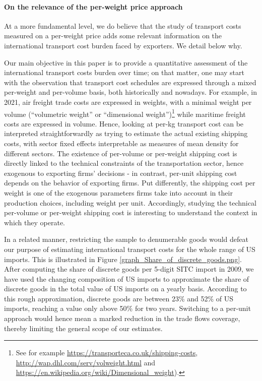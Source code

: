 \documentclass[11pt,twoside, authoryear]{elsarticle}
\begin{document}
\paragraph{On the relevance of the per-weight price approach}
At a more fundamental level, we do believe that the study of transport costs measured on a per-weight price adds some relevant information on the international transport cost burden faced by exporters. We detail below why.

Our main objective in this paper is to provide a quantitative assessment of the international transport costs burden over time; on that matter, one may start with the observation that transport cost schedules are expressed through a mixed per-weight and per-volume basis, both historically and nowadays. For example, in 2021, air freight trade costs are expressed in weights, with a minimal weight per volume (``volumetric weight'' or ``dimensional weight'')\footnote{See for example \href{https://transporteca.co.uk/shipping-costs}{https://transporteca.co.uk/shipping-costs}, \href{http://wap.dhl.com/serv/volweight.html}{http://wap.dhl.com/serv/volweight.html} and \href{https://en.wikipedia.org/wiki/Dimensional_weight}{ https://en.wikipedia.org/wiki/Dimensional\_weight}).} while maritime freight costs are expressed in volume.
Hence, looking at per-kg transport cost can be interpreted straightforwardly as trying to estimate the actual existing shipping costs, with sector fixed effects interpretable as measures of mean density for different sectors. The existence of per-volume or per-weight shipping cost is directly linked to the technical constraints of the transportation sector, hence exogenous to exporting firms' decisions - in contrast, per-unit shipping cost depends on the behavior of exporting firms. Put differently, the shipping cost per weight is one of the exogenous parameters firms take into account in their production choices, including weight per unit. Accordingly, studying the technical per-volume or per-weight shipping cost is interesting to understand the context in which they operate.


In a related manner, restricting the sample to denumerable goods would defeat our purpose of estimating international transport costs for the whole range of US imports. This is illustrated in Figure \ref{graph_Share_of_discrete_goods.png}. After computing the share of discrete goods per 5-digit SITC import in 2009, we have used the changing composition of US imports to approximate the share of discrete goods in the total value of US imports on a yearly basis. According to this rough approximation, discrete goods are between 23\% and 52\% of US imports, reaching a value only above 50\% for two years. Switching to a per-unit approach would hence mean a marked reduction in the trade flows coverage, thereby limiting the general scope of our estimates.
\end{document}
